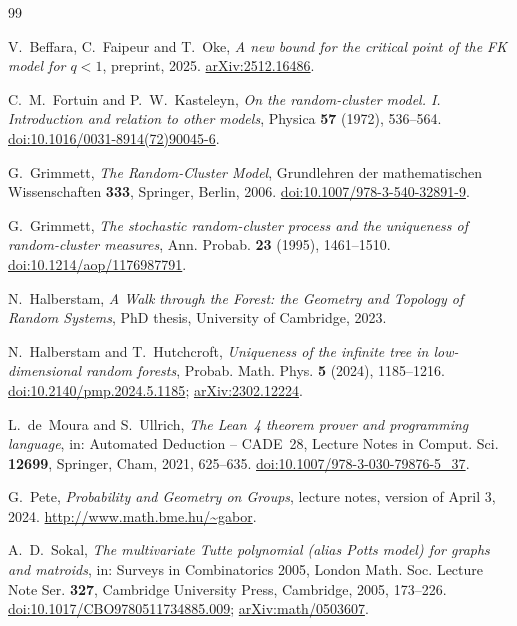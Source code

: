 \documentclass[11pt]{amsart}
\theoremstyle{remark}
\numberwithin{equation}{section}
\begin{document}
\begin{thebibliography}{99}

V.~Beffara, C.~Faipeur and T.~Oke,
\emph{A new bound for the critical point of the FK model for $q<1$},
preprint, 2025.
\href{https://arxiv.org/abs/2512.16486}{arXiv:2512.16486}.

C.~M.~Fortuin and P.~W.~Kasteleyn,
\emph{On the random-cluster model. I. Introduction and relation to other models},
Physica \textbf{57} (1972), 536--564.
\href{https://doi.org/10.1016/0031-8914(72)90045-6}{doi:10.1016/0031-8914(72)90045-6}.

G.~Grimmett,
\emph{The Random-Cluster Model},
Grundlehren der mathematischen Wissenschaften \textbf{333}, Springer, Berlin, 2006.
\href{https://doi.org/10.1007/978-3-540-32891-9}{doi:10.1007/978-3-540-32891-9}.

G.~Grimmett,
\emph{The stochastic random-cluster process and the uniqueness of random-cluster measures},
Ann. Probab. \textbf{23} (1995), 1461--1510.
\href{https://doi.org/10.1214/aop/1176987791}{doi:10.1214/aop/1176987791}.

N.~Halberstam,
\emph{A Walk through the Forest: the Geometry and Topology of Random Systems},
PhD thesis, University of Cambridge, 2023.

N.~Halberstam and T.~Hutchcroft,
\emph{Uniqueness of the infinite tree in low-dimensional random forests},
Probab. Math. Phys. \textbf{5} (2024), 1185--1216.
\href{https://doi.org/10.2140/pmp.2024.5.1185}{doi:10.2140/pmp.2024.5.1185};
\href{https://arxiv.org/abs/2302.12224}{arXiv:2302.12224}.

L.~de~Moura and S.~Ullrich,
\emph{The Lean~4 theorem prover and programming language},
in: Automated Deduction -- CADE~28, Lecture Notes in Comput. Sci. \textbf{12699}, Springer, Cham, 2021, 625--635.
\href{https://doi.org/10.1007/978-3-030-79876-5_37}{doi:10.1007/978-3-030-79876-5\_37}.

G.~Pete,
\emph{Probability and Geometry on Groups},
lecture notes, version of April 3, 2024.
\url{http://www.math.bme.hu/~gabor}.

A.~D.~Sokal,
\emph{The multivariate Tutte polynomial (alias Potts model) for graphs and matroids},
in: Surveys in Combinatorics 2005, London Math. Soc. Lecture Note Ser. \textbf{327}, Cambridge University Press, Cambridge, 2005, 173--226.
\href{https://doi.org/10.1017/CBO9780511734885.009}{doi:10.1017/CBO9780511734885.009};
\href{https://arxiv.org/abs/math/0503607}{arXiv:math/0503607}.

\end{thebibliography}
\end{document}

